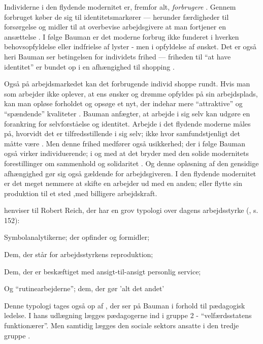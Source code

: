 Individerne i den flydende modernitet er, fremfor alt, \textit{forbrugere} \autocite[s 73ff; s. 76]{baumanLiquidModernity2000}.
Gennem forbruget køber de sig til identitetsmarkører --- herunder færdigheder til forsørgelse og midler til at overbevise arbejdsgivere at man fortjener en ansættelse \autocite[s. 74]{baumanLiquidModernity2000}.
I følge Bauman er det moderne forbrug ikke funderet i hverken behovsopfyldelse eller indfrielse af lyster - men i opfyldelse af ønsket.
Det er også heri Bauman ser betingelsen for individets frihed --- friheden til “at have identitet” er bundet op i en afhængighed til shopping \autocite[s. 84]{baumanLiquidModernity2000}.

Også på arbejdsmarkedet kan det forbrugende individ shoppe rundt.
Hvis man som arbejder ikke oplever, at ens ønsker og drømme opfyldes på sin arbejdsplads, kan man opløse forholdet og opsøge et nyt, der indehar mere “attraktive” og “spændende” kvaliteter \autocite[s. 169]{kofodOrganisationOgLedelse2016}.
Bauman anfægter, at arbejde i sig selv kan udgøre en forankring for selvforståelse og identitet.
Arbejde i det flydende moderne måles på, hvorvidt det er tilfredsstillende i sig selv; ikke hvor samfundstjenligt det måtte være \autocite[s. 139; 163f]{baumanLiquidModernity2000}.
Men denne frihed medfører også usikkerhed; der i følge Bauman også virker individuerende; i og med at det bryder med den solide modernitets forestillinger om sammenhold og solidaritet \autocite[s. 148]{baumanLiquidModernity2000}.
Og denne opløsning af den gensidige afhængighed gør sig også gældende for arbejdsgiveren.
I den flydende modernitet er det meget nemmere at skifte en arbejder ud med en anden; eller flytte sin produktion til et sted ,med billigere arbejdskraft.

\citeauthor{baumanLiquidModernity2000} henviser til Robert Reich, der har en grov typologi over dagens arbejdsstyrke (\citeyear{baumanLiquidModernity2000}, s. 152):

Symbolanalytikerne; der opfinder og formidler;

Dem, der står for arbejdsstyrkens reproduktion;

Dem, der er beskæftiget med ansigt-til-ansigt personlig service;

Og “rutinearbejderne”; dem, der gør 'alt det andet'

Denne typologi tages også op af \citeauthor{kofodOrganisationOgLedelse2016}, der ser på Bauman i forhold til pædagogisk ledelse.
I hans udlægning lægges pædagogerne ind i gruppe 2 - “velfærdsstatens funktionærer”.
Men samtidig lægges den sociale sektors ansatte i den tredje gruppe \autocite[s. 166]{kofodOrganisationOgLedelse2016}.

